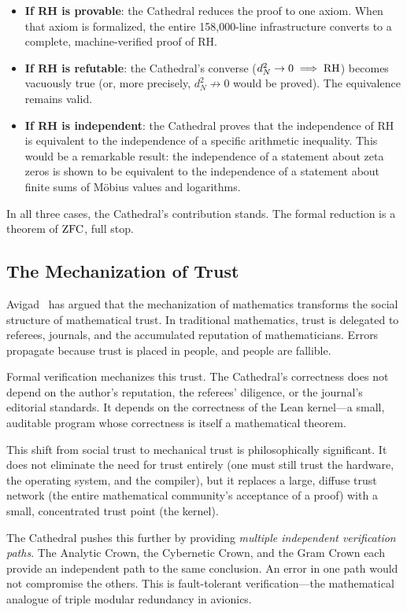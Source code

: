 \begin{itemize}
  \item \textbf{If RH is provable}: the Cathedral reduces the
    proof to one axiom. When that axiom is formalized, the
    entire 158{,}000-line infrastructure converts to a complete,
    machine-verified proof of RH.

  \item \textbf{If RH is refutable}: the Cathedral's converse
    ($d_N^2 \to 0 \implies \mathrm{RH}$) becomes vacuously true (or,
    more precisely, $d_N^2 \not\to 0$ would be proved). The
    equivalence remains valid.

  \item \textbf{If RH is independent}: the Cathedral proves
    that the independence of RH is equivalent to the independence
    of a specific arithmetic inequality. This would be a
    remarkable result: the independence of a statement about
    zeta zeros is shown to be equivalent to the independence
    of a statement about finite sums of M\"obius values and
    logarithms.
\end{itemize}

In all three cases, the Cathedral's contribution stands. The
formal reduction is a theorem of $\mathrm{ZFC}$, full stop.

\subsection{The Mechanization of Trust}

Avigad~\cite{avigad2018} has argued that the mechanization of
mathematics transforms the social structure of mathematical trust.
In traditional mathematics, trust is delegated to referees,
journals, and the accumulated reputation of mathematicians. Errors
propagate because trust is placed in people, and people are
fallible.

Formal verification mechanizes this trust. The Cathedral's
correctness does not depend on the author's reputation, the
referees' diligence, or the journal's editorial standards. It
depends on the correctness of the Lean kernel---a small,
auditable program whose correctness is itself a mathematical
theorem.

This shift from social trust to mechanical trust is
philosophically significant. It does not eliminate the need for
trust entirely (one must still trust the hardware, the operating
system, and the compiler), but it replaces a large, diffuse
trust network (the entire mathematical community's acceptance
of a proof) with a small, concentrated trust point (the kernel).

The Cathedral pushes this further by providing
\emph{multiple independent verification paths}. The Analytic
Crown, the Cybernetic Crown, and the Gram Crown each provide an
independent path to the same conclusion. An error in one path
would not compromise the others. This is fault-tolerant
verification---the mathematical analogue of triple modular
redundancy in avionics.
